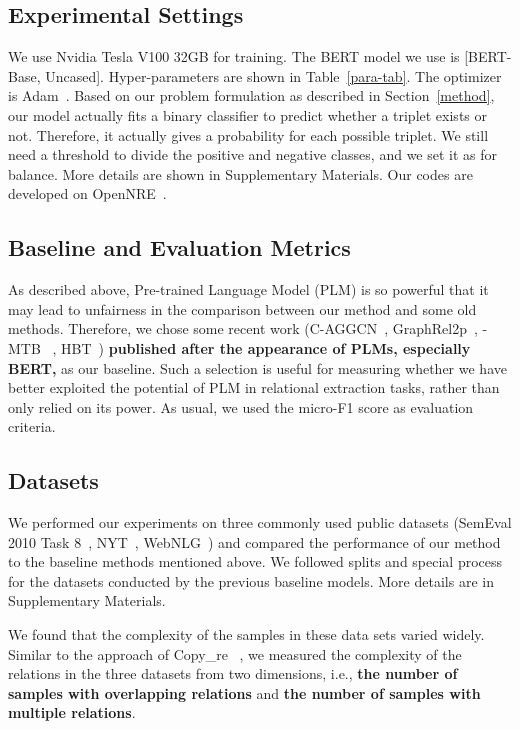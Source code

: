 \documentclass[11pt,a4paper]{article}
\begin{document}
\subsection{Experimental Settings}
We use Nvidia Tesla V100 32GB for training. The BERT model we use is [BERT-Base, Uncased]. Hyper-parameters are shown in Table~\ref{para-tab}. The optimizer is Adam~\cite{kingma2014adam}. Based on our problem formulation as described in Section~\ref{method}, our model actually fits a binary classifier to predict whether a triplet exists or not. Therefore, it actually gives a probability for each possible triplet. We still need a threshold to divide the positive and negative classes, and we set it as  for balance. More details are shown in Supplementary Materials.
 Our codes are developed on OpenNRE~\cite{han2019opennre}. 
\subsection{Baseline and Evaluation Metrics}
As described above, Pre-trained Language Model (PLM) is so powerful that it may lead to unfairness in the comparison between our method and some old methods. Therefore, we chose some recent work (C-AGGCN~\cite{guo2019attention},
GraphRel2p~\cite{fu2019graphrel},
-MTB ~\cite{soares2019matching},
HBT~\cite{wei2019novel}) \textbf{published after the appearance of PLMs, especially BERT,} as our baseline. Such a selection is useful for measuring whether we have better exploited the potential of PLM in relational extraction tasks, rather than only relied on its power. As usual, we used the micro-F1 score as evaluation criteria.
\subsection{Datasets}
We performed our experiments on three commonly used public datasets (SemEval 2010 Task 8~\cite{hendrickx2009semeval}, NYT~\cite{riedel2010modeling},   WebNLG~\cite{gardent2017creating}) and compared the performance of our method to the baseline methods mentioned above. We followed splits and special process for the datasets conducted by the previous baseline models. More details are in Supplementary Materials.

We found that the complexity of the samples in these data sets varied widely. Similar to the  approach of Copy\_re ~\cite{zeng2018extracting}, we measured the complexity of the relations in the three datasets from two dimensions, i.e., \textbf{the number of samples with overlapping relations} and \textbf{the number of samples with multiple relations}. 
\end{document}
